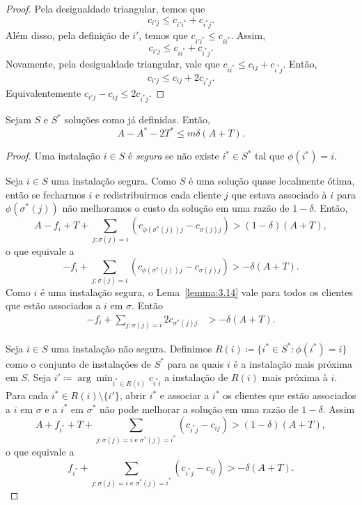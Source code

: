 \begin{proof}
    Pela desigualdade triangular, temos que
    \[c_{i'j} \leq c_{i'i^*} + c_{i^*j}.\] Além disso, pela definição de $i'$, temos que $c_{i'i^*} \leq c_{ii^*}$. Assim,
    \[c_{i'j} \leq c_{ii^*} + c_{i^*j}.\]
    Novamente, pela desigualdade triangular, vale que $c_{ii^*} \leq c_{ij} + c_{i^*j}$. Então,
    \[  c_{i'j} \leq c_{ij} + 2 c_{i^*j}.\] 
    Equivalentemente \( c_{i'j} - c_{ij} \leq 2 c_{i^*j}. \)
\end{proof}

\begin{lemma}
    \label{lemma:3.15}
    Sejam $S$ e $S^*$ soluções como já definidas. Então,
    \[A - A^* - 2T^* \leq m \delta(A+T).\]
\end{lemma}

\begin{proof}
    Uma instalação $i \in S$ é \emph{segura} se não existe $i^* \in S^*$ tal que $\phi(i^*)=i$.

    Seja $i \in S$ uma instalação segura. Como $S$ é uma solução quase localmente ótima, então se fecharmos $i$ e redistribuirmos cada cliente $j$ que estava associado à $i$ para $\phi(\sigma^*(j))$  não melhoramos o custo da solução em uma razão de $1-\delta$. Então,
    \[
        A - f_i + T + \sum_{j:\sigma(j) = i} (c_{\phi(\sigma^*(j))j} - c_{\sigma(j)j}) > (1-\delta)(A+T),\]
        o que equivale a 
        \[
        - f_i + \sum_{j:\sigma(j) = i} (c_{\phi(\sigma^*(j))j} - c_{\sigma(j)j}) > -\delta(A+T).
        \]
    Como $i$ é uma instalação segura, o Lema~\ref{lemma:3.14} vale para todos os clientes que estão associados a $i$ em $\sigma$. Então
    \begin{align} 
        \label{segura}
        - f_i + \sum_{j:\sigma(j) = i} 2c_{\sigma^*(j)j} &> -\delta(A+T).
    \end{align}

    Seja $i\in S$ uma instalação não segura. Definimos $R(i)\coloneqq \{i^* \in S^* : \phi(i^*) = i\}$ como o conjunto de instalações de $S^*$ para as quais $i$ é a instalação mais próxima em $S$. Seja $i' \coloneqq \arg\min_{i^* \in R(i)} c_{i^*i}$ a instalação de $R(i)$ mais próxima à $i$.
    Para cada $i^* \in R(i)\setminus\{i'\}$, abrir $i^*$ e associar a $i^*$ os clientes que estão associados a $i$ em $\sigma $ e a $i^*$ em $\sigma^*$ não pode melhorar a solução em uma razão de $1-\delta$. Assim
    \[
        A + f_{i^*} + T + \sum_{j: \sigma(j) = i \text{ e } \sigma^*(j) = i^*}(c_{i^*j} - c_{ij}) > (1-\delta)(A+T),\]
    o que equivale a 
        \begin{equation}
        \label{não segura}
        f_{i^*} + \sum_{j: \sigma(j) = i \text{ e } \sigma^*(j) = i^*}(c_{i^*j} - c_{ij}) > -\delta(A+T).        
    \end{equation}    


\end{proof}
